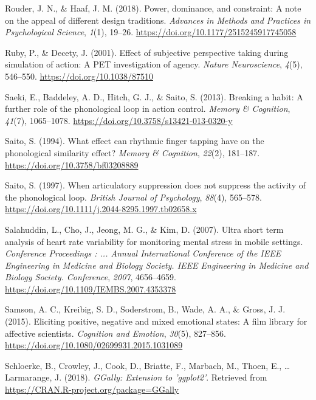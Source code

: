 \documentclass[a4paper,12pt,twoside,onecolumn,openright,final,oldfontcommands]{memoir}
\begin{document}
\leavevmode\hypertarget{ref-rouder_power_2018}{}%
Rouder, J. N., \& Haaf, J. M. (2018). Power, dominance, and constraint: A note on the appeal of different design traditions. \emph{Advances in Methods and Practices in Psychological Science}, \emph{1}(1), 19--26. \url{https://doi.org/10.1177/2515245917745058}

\leavevmode\hypertarget{ref-ruby_effect_2001}{}%
Ruby, P., \& Decety, J. (2001). Effect of subjective perspective taking during simulation of action: A PET investigation of agency. \emph{Nature Neuroscience}, \emph{4}(5), 546--550. \url{https://doi.org/10.1038/87510}

\leavevmode\hypertarget{ref-saeki_breaking_2013}{}%
Saeki, E., Baddeley, A. D., Hitch, G. J., \& Saito, S. (2013). Breaking a habit: A further role of the phonological loop in action control. \emph{Memory \& Cognition}, \emph{41}(7), 1065--1078. \url{https://doi.org/10.3758/s13421-013-0320-y}

\leavevmode\hypertarget{ref-saito_what_1994}{}%
Saito, S. (1994). What effect can rhythmic finger tapping have on the phonological similarity effect? \emph{Memory \& Cognition}, \emph{22}(2), 181--187. \url{https://doi.org/10.3758/bf03208889}

\leavevmode\hypertarget{ref-saito_when_1997}{}%
Saito, S. (1997). When articulatory suppression does not suppress the activity of the phonological loop. \emph{British Journal of Psychology}, \emph{88}(4), 565--578. \url{https://doi.org/10.1111/j.2044-8295.1997.tb02658.x}

\leavevmode\hypertarget{ref-Salahuddin2007}{}%
Salahuddin, L., Cho, J., Jeong, M. G., \& Kim, D. (2007). Ultra short term analysis of heart rate variability for monitoring mental stress in mobile settings. \emph{Conference Proceedings : ... Annual International Conference of the IEEE Engineering in Medicine and Biology Society. IEEE Engineering in Medicine and Biology Society. Conference}, \emph{2007}, 4656--4659. \url{https://doi.org/10.1109/IEMBS.2007.4353378}

\leavevmode\hypertarget{ref-samson_eliciting_2015}{}%
Samson, A. C., Kreibig, S. D., Soderstrom, B., Wade, A. A., \& Gross, J. J. (2015). Eliciting positive, negative and mixed emotional states: A film library for affective scientists. \emph{Cognition and Emotion}, \emph{30}(5), 827--856. \url{https://doi.org/10.1080/02699931.2015.1031089}

\leavevmode\hypertarget{ref-R-GGally}{}%
Schloerke, B., Crowley, J., Cook, D., Briatte, F., Marbach, M., Thoen, E., \ldots{} Larmarange, J. (2018). \emph{GGally: Extension to 'ggplot2'}. Retrieved from \url{https://CRAN.R-project.org/package=GGally}
\end{document}
